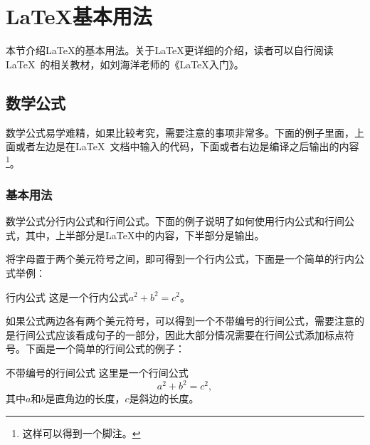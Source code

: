 \section{\LaTeX 基本用法}
本节介绍\LaTeX 的基本用法。关于\LaTeX 更详细的介绍，读者可以自行阅读\LaTeX~的相关教材，如刘海洋老师的《LaTeX入门》\cite{Liu2013}。

\subsection{数学公式}
数学公式易学难精，如果比较考究，需要注意的事项非常多。下面的例子里面，上面或者左边是在\LaTeX~文档中输入的代码，下面或者右边是编译之后输出的内容\footnote{这样可以得到一个脚注。}。

\subsubsection{基本用法}
数学公式分行内公式和行间公式。下面的例子说明了如何使用行内公式和行间公式，其中，上半部分是LaTeX中的内容，下半部分是输出。


将字母置于两个美元符号之间，即可得到一个行内公式，下面是一个简单的行内公式举例：
\begin{myexample2}{行内公式}
这是一个行内公式$a^2+b^2=c^2$。
\end{myexample2}

如果公式两边各有两个美元符号，可以得到一个不带编号的行间公式，需要注意的是行间公式应该看成句子的一部分，因此大部分情况需要在行间公式添加标点符号。下面是一个简单的行间公式的例子：
\begin{myexample}{不带编号的行间公式}
这里是一个行间公式
$$a^2+b^2=c^2,$$
其中$a$和$b$是直角边的长度，$c$是斜边的长度。
\end{myexample}

